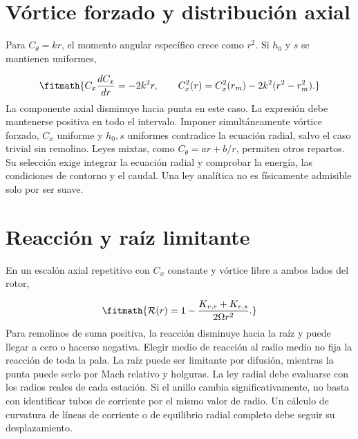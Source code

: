 \documentclass[10pt,openany]{book}
\begin{document}
\begin{minipage}{\linewidth}
\begin{tikzpicture}
\end{tikzpicture}%
\fi
\fi
\endgroup
\par\nopagebreak
{}
\end{minipage}
\par\vspace{\baselineskip}

\section{Vórtice forzado y distribución axial}

Para \(C_\theta=kr\), el momento angular específico crece como \(r^2\). Si \(h_0\) y \(s\) se mantienen uniformes,

\[
\fitmath{C_x\frac{dC_x}{dr}=-2k^2r,\qquad
C_x^2(r)=C_x^2(r_m)-2k^2(r^2-r_m^2).}
\]
La componente axial disminuye hacia punta en este caso. La expresión debe mantenerse positiva en todo el intervalo. Imponer simultáneamente vórtice forzado, \(C_x\) uniforme y \(h_0,s\) uniformes contradice la ecuación radial, salvo el caso trivial sin remolino.
Leyes mixtas, como \(C_\theta=ar+b/r\), permiten otros repartos. Su selección exige integrar la ecuación radial y comprobar la energía, las condiciones de contorno y el caudal. Una ley analítica no es físicamente admisible solo por ser suave.

\section{Reacción y raíz limitante}

En un escalón axial repetitivo con \(C_x\) constante y vórtice libre a ambos lados del rotor,

\[
\fitmath{\mathcal R(r)=1-\frac{K_{v,e}+K_{v,s}}{2\Omega r^2}.}
\]
Para remolinos de suma positiva, la reacción disminuye hacia la raíz y puede llegar a cero o hacerse negativa. Elegir medio de reacción al radio medio no fija la reacción de toda la pala. La raíz puede ser limitante por difusión, mientras la punta puede serlo por Mach relativo y holguras.
La ley radial debe evaluarse con los radios reales de cada estación. Si el anillo cambia significativamente, no basta con identificar tubos de corriente por el mismo valor de radio. Un cálculo de curvatura de líneas de corriente o de equilibrio radial completo debe seguir su desplazamiento.
\end{document}
